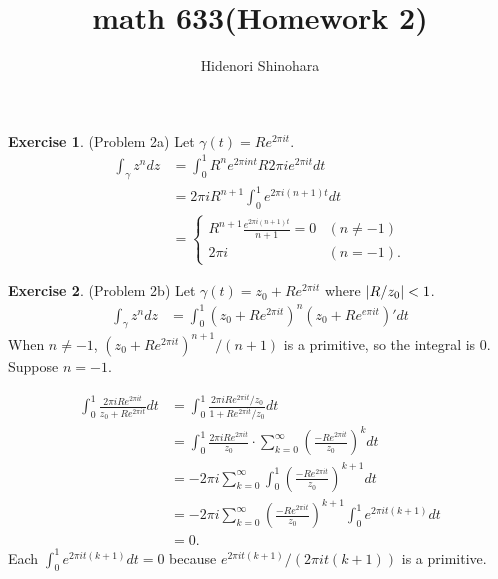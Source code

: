 \documentclass[12pt, psamsfonts]{amsart}
\theoremstyle{definition}
\newtheorem*{exer}{Exercise}
\theoremstyle{remark}
\numberwithin{equation}{section}
\begin{document}
\title{math 633(Homework 2)}
\author{Hidenori Shinohara}
\maketitle

\begin{exer}{(Problem 2a)}
  Let $\gamma(t) = Re^{2\pi it}$.
  \begin{align*}
    \int_{\gamma} z^ndz
      &= \int_{0}^{1} R^ne^{2\pi i nt}R2\pi ie^{2\pi it} dt \\
      &= 2\pi i R^{n + 1}\int_{0}^{1} e^{2\pi i (n + 1)t} dt \\
      &= \begin{cases}
        R^{n + 1} \frac{e^{2\pi i(n + 1)t}}{n + 1} = 0 & (n \ne -1) \\
        2\pi i & (n = -1).
      \end{cases}
  \end{align*}
\end{exer}

\begin{exer}{(Problem 2b)}
  Let $\gamma(t) = z_0 + Re^{2\pi it}$ where $\abs{R / z_0} < 1$.
  \begin{align*}
    \int_{\gamma} z^ndz
      &= \int_{0}^{1} (z_0 + Re^{2\pi it})^n(z_0 + Re^{e\pi it})' dt
  \end{align*}
  When $n \ne -1$, $(z_0 + Re^{2\pi it})^{n + 1} / (n + 1)$ is a primitive, so the integral is 0.
  Suppose $n = -1$.

  \begin{align*}
    \int_{0}^{1} \frac{2 \pi i Re^{2\pi it}}{z_0 + Re^{2\pi i t}} dt
      &= \int_{0}^{1} \frac{2 \pi i Re^{2\pi it} / z_0}{1 + Re^{2\pi i t} / z_0} dt \\
      &= \int_{0}^{1} \frac{2\pi i Re^{2\pi it}}{z_0} \cdot \sum_{k=0}^{\infty} (\frac{-Re^{2\pi it}}{z_0})^kdt \\
      &= -2\pi i\sum_{k=0}^{\infty} \int_0^1 (\frac{-Re^{2\pi it}}{z_0})^{k + 1} dt \\
      &= -2\pi i\sum_{k=0}^{\infty} (\frac{-Re^{2\pi it}}{z_0})^{k + 1}\int_0^1 e^{2\pi i t(k + 1)} dt \\
      &= 0.
  \end{align*}
  Each $\int_0^1 e^{2\pi i t(k + 1)} dt = 0$ because $e^{2\pi it(k + 1)} / (2\pi i t(k + 1))$ is a primitive.
\end{exer}
\end{document}
